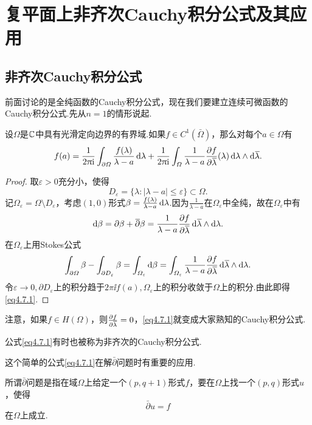 \section{复平面上非齐次Cauchy积分公式及其应用\label{sec4.7}}
\subsection{非齐次Cauchy积分公式}
前面讨论的是全纯函数的Cauchy积分公式，现在我们要建立连续可微函数的\\
Cauchy积分公式.先从$n=1$的情形说起.
\begin{theorem}\label{thm4.7.1}
	设$\Omega$是$\mathbb C$中具有光滑定向边界的有界域.如果$f\in C^1(\bar{\Omega})$，那么对每个$a\in\Omega$有
	\begin{equation}\label{eq4.7.1}
		f(a)=\frac1{2\uppi\mathrm i}\int_{\partial\varOmega}\frac{f(\lambda)}{\lambda-a}\mathop{}\!\mathrm{d}\lambda+\frac1{2\uppi\mathrm i}\int_\varOmega \frac1{\lambda-a}\frac{\partial f}{\partial {}\mkern1mu\overline{\mkern-1mu\lambda}}(\lambda)\mathop{}\!\mathrm{d}\lambda\wedge\mathop{}\!\mathrm{d}{}\mkern1mu\overline{\mkern-1mu\lambda}.
	\end{equation}
\end{theorem}
\begin{proof}
	取$\varepsilon>0$充分小，使得
	\[D_\varepsilon=\{\lambda\colon|\lambda-a|\le\varepsilon\}\subset\Omega.\]
	记$\Omega_\varepsilon=\Omega\setminus D_\varepsilon$，考虑$(1,0)$形式$\beta=\frac{f(\lambda)}{\lambda-a}\mathop{}\!\mathrm{d}\lambda$.因为$\frac1{\lambda-a}$在$\Omega_\varepsilon$中全纯，故在$\Omega_\varepsilon$中有
	\[\mathop{}\!\mathrm{d}\beta=\partial\beta+{}\mkern1mu\overline{\mkern-1mu\partial}\beta=\frac1{\lambda-a}\frac{\partial f}{\partial {}\mkern1mu\overline{\mkern-1mu\lambda}}\mathop{}\!\mathrm{d}{}\mkern1mu\overline{\mkern-1mu\lambda}\wedge\mathop{}\!\mathrm{d}\lambda.\]
	在$\Omega_\varepsilon$上用Stokes公式
	\[\int_{\partial\varOmega}\beta-\int_{\partial D_\varepsilon}\beta=\int_{\varOmega_\varepsilon}\mathop{}\!\mathrm{d}\beta=\int_{\varOmega_\varepsilon}\frac1{\lambda-a}\frac{\partial f}{\partial {}\mkern1mu\overline{\mkern-1mu\lambda}}\mathop{}\!\mathrm{d}{}\mkern1mu\overline{\mkern-1mu\lambda}\wedge\mathop{}\!\mathrm{d}\lambda.\]
	令$\varepsilon\to0,\partial D_\varepsilon$上的积分趋于$2\pi\ii f(a),\Omega_\varepsilon$上的积分收敛于$\Omega$上的积分.由此即得\eqref{eq4.7.1}.
\end{proof}
注意，如果$f\in H(\Omega)$，则$\frac{\partial f}{\partial {}\mkern1mu\overline{\mkern-1mu\lambda}}=0$，\eqref{eq4.7.1}就变成大家熟知的Cauchy积分公式.

公式\eqref{eq4.7.1}有时也被称为非齐次的Cauchy积分公式.

这个简单的公式\eqref{eq4.7.1}在解$\bar{\partial}$问题时有重要的应用.

所谓$\bar{\partial}$问题是指在域$\Omega$上给定一个$(p,q+1)$形式$f$，要在$\Omega$上找一个$(p,q)$形式$u$，使得
\begin{equation}\label{eq4.7.2}
	\bar{\partial}u=f
\end{equation}
在$\Omega$上成立.


